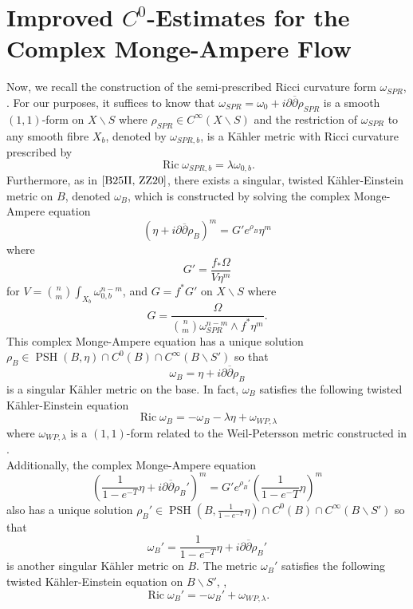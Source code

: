 \documentclass[12pt]{article}
\numberwithin{equation}{section}
\renewcommand{\d}{\partial}
\newcommand{\dbar}{\overline{\partial}}
\DeclareMathOperator{\Ric}{Ric}
\DeclareMathOperator{\PSH}{PSH}
\begin{document}
\section{Improved $C^0$-Estimates for the Complex Monge-Ampere Flow}

Now, we recall the construction of the semi-prescribed Ricci curvature form $\omega_{SPR}$, \cite{B25II, ZZ20}. For our purposes, it suffices to know that $\omega_{SPR} = \omega_0 + i\d\dbar \rho_{SPR}$ is a smooth $(1,1)$-form on $X \backslash S$ where $\rho_{SPR} \in C^{\infty}(X \backslash S)$ and the restriction of $\omega_{SPR}$ to any smooth fibre $X_b$, denoted by $\omega_{SPR,b}$, is a K\"ahler metric with Ricci curvature prescribed by
\begin{equation*}
    \Ric \omega_{SPR,b} = \lambda \omega_{0,b}.
\end{equation*}
Furthermore, as in $\cite{B25II, ZZ20}$, there exists a singular, twisted K\"ahler-Einstein metric on $B$, denoted $\omega_{B}$, which is constructed by solving the complex Monge-Ampere equation
\begin{equation}\label{base_space_CMA_1}
    (\eta + i\d\dbar \rho_B)^m = G' e^{\rho_B} \eta^m
\end{equation}
where
\begin{equation*}
    G' = \frac{f_* \Omega}{V \eta^m}
\end{equation*}
for $V = {n\choose m} \int_{X_b} \omega_{0,b}^{n-m}$, and $G = f^*G'$ on $X \backslash S$ where
\begin{equation*}
    G = \frac{\Omega}{{n\choose m} \omega_{SPR}^{n-m} \wedge f^*\eta^m}. 
\end{equation*}
This complex Monge-Ampere equation has a unique solution $\rho_B \in \PSH(B,\eta) \cap C^0(B) \cap C^{\infty}(B \backslash S')$ so that
\begin{equation*}
    \omega_B = \eta + i\d\dbar \rho_B
\end{equation*}
is a singular K\"ahler metric on the base. In fact, $\omega_B$ satisfies the following twisted K\"ahler-Einstein equation
\begin{equation*}
    \Ric \omega_B = -\omega_B - \lambda \eta + \omega_{WP,\lambda}
\end{equation*}
where $\omega_{WP,\lambda}$ is a $(1,1)$-form related to the Weil-Petersson metric constructed in \cite{B25II}.\\
Additionally, the complex Monge-Ampere equation
\begin{equation*}
    \left(\frac{1}{1-e^{-T}}\eta + i\d\dbar \rho_B'\right)^m = G' e^{\rho_B'} \left(\frac{1}{1-e{^-T}}\eta\right)^m
\end{equation*}
also has a unique solution $\rho_B' \in \PSH(B,\frac{1}{1-e^{-T}}\eta) \cap C^0(B) \cap C^{\infty}(B \backslash S')$ so that
\begin{equation*}
    \omega_B' = \frac{1}{1-e^{-T}} \eta + i\d\dbar \rho_B'
\end{equation*}
is another singular K\"ahler metric on $B$. The metric $\omega_B'$ satisfies the following twisted K\"ahler-Einstein equation on $ B \backslash S'$, \cite{B25II},
\begin{equation*}
    \Ric \omega_B' = -\omega_B' + \omega_{WP,\lambda}.
\end{equation*}
\end{document}
